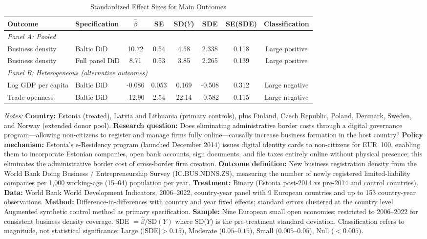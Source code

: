\begin{table}[H]
\centering
\caption{Standardized Effect Sizes for Main Outcomes}
\label{tab:sde}
\begin{threeparttable}
\footnotesize
\begin{tabular}{llcccccc}
\toprule
Outcome & Specification & $\hat{\beta}$ & SE & SD($Y$) & SDE & SE(SDE) & Classification \\
\midrule
\multicolumn{8}{l}{\textit{Panel A: Pooled}} \\
Business density & Baltic DiD & 10.72 & 0.54 & 4.58 & 2.338 & 0.118 & Large positive \\
Business density & Full panel DiD & 8.71 & 0.53 & 3.85 & 2.265 & 0.139 & Large positive \\
\midrule
\multicolumn{8}{l}{\textit{Panel B: Heterogeneous (alternative outcomes)}} \\
Log GDP per capita & Baltic DiD & -0.086 & 0.053 & 0.169 & -0.508 & 0.312 & Large negative \\
Trade openness & Baltic DiD & -12.90 & 2.54 & 22.14 & -0.582 & 0.115 & Large negative \\
\bottomrule
\end{tabular}
\begin{tablenotes}[flushleft]\sloppy
\scriptsize\sloppy
\item \textit{Notes:} \textbf{Country:} Estonia (treated), Latvia and Lithuania (primary controls), plus Finland, Czech Republic, Poland, Denmark, Sweden, and Norway (extended donor pool). \textbf{Research question:} Does eliminating administrative border costs through a digital governance program---allowing non-citizens to register and manage firms fully online---causally increase business formation in the host country? \textbf{Policy mechanism:} Estonia's e-Residency program (launched December 2014) issues digital identity cards to non-citizens for EUR~100, enabling them to incorporate Estonian companies, open bank accounts, sign documents, and file taxes entirely online without physical presence; this eliminates the administrative border cost of cross-border firm creation. \textbf{Outcome definition:} New business registration density from the World Bank Doing Business / Entrepreneurship Survey (IC.BUS.NDNS.ZS), measuring the number of newly registered limited-liability companies per 1,000 working-age (15--64) population per year. \textbf{Treatment:} Binary (Estonia post-2014 vs pre-2014 and control countries). \textbf{Data:} World Bank World Development Indicators, 2006--2022, country-year panel with 9 European countries and up to 153 country-year observations. \textbf{Method:} Difference-in-differences with country and year fixed effects; standard errors clustered at the country level. Augmented synthetic control method as primary specification. \textbf{Sample:} Nine European small open economies; restricted to 2006--2022 for consistent business density coverage. SDE $= \hat{\beta} / \text{SD}(Y)$ where SD($Y$) is the pre-treatment standard deviation. Classification refers to magnitude, not statistical significance: Large ($|$SDE$| > 0.15$), Moderate ($0.05$--$0.15$), Small ($0.005$--$0.05$), Null ($< 0.005$). 
\end{tablenotes}
\end{threeparttable}
\end{table}
